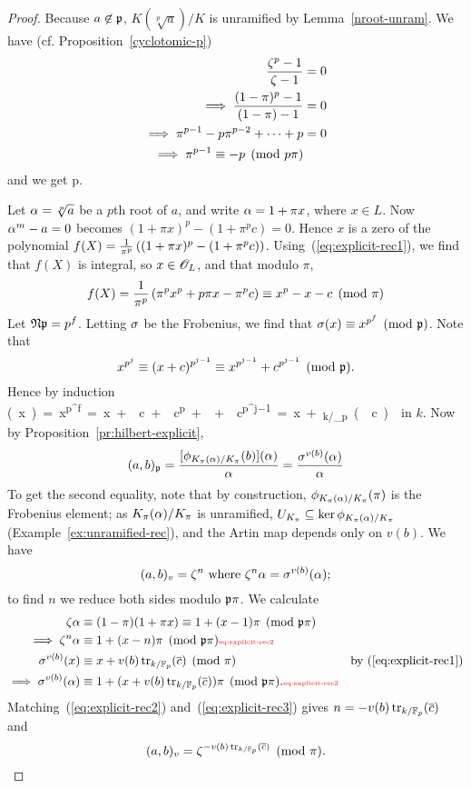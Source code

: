 \begin{proof}
Because $a\not\in \mathfrak{p}$, $K(\sqrt[p]{a})/K$ is unramified by Lemma~\ref{nroot-unram}. 
We have (cf. Proposition~\ref{cyclotomic-p}) 
\begin{align*}
\frac{\zeta^p-1}{\zeta-1}&=0\\
\implies \frac{(1-\pi)^p-1}{(1-\pi)-1}&=0\\
\implies \pi^{p-1}-p\pi^{p-2}+\cdots +p&=0\\
\implies \pi^{p-1}\equiv -p\pmod{p\pi}
\end{align*}
and we get 
p\pmod{\mfp}.
\eeq

Let $\alpha=\sqrt[p]{a}$ be a $p$th root of $a$, and write $\alpha=1+\pi x$, where $x\in L$. Now $\alpha^m-a=0$ becomes $(1+\pi x)^p-(1+\pi^pc)=0$. Hence $x$ is a zero of the polynomial $f(X)=\frac{1}{\pi^p}\left( {(1+\pi x)^p-(1+\pi^pc)} \right)$. 
Using~(\ref{eq:explicit-rec1}), we find that $f(X)$ is integral, so $x\in \mathscr{O}_L$, and that modulo $\pi$,
\[
f(X)=\frac{1}{\pi^p}\left( { \pi^px^p+p\pi x-\pi^pc} \right)\equiv x^p-x-c\pmod{\pi}\]
Let $\mathfrak{N}\mathfrak{p}=p^f$. Letting $\sigma$ be the Frobenius, we find that 
$\sigma(x)\equiv x^{p^f}\pmod{\mathfrak{p}}$. Note that
\[
x^{p^j}\equiv (x+c)^{p^{j-1}}\equiv x^{p^{j-1}}+c^{p^{j-1}}\pmod{\mathfrak{p}}.
\]
Hence by induction
\si(x)=x^{p^f}=x+\ol c+\ol c^p+\cdots +\ol c^{p^{j-1}}=x+\tr_{k/\F_p}(\ol c)
\eeq
in $k$. Now by Proposition~\ref{pr:hilbert-explicit},
\[
(a,b)_{\mathfrak{p}}=\frac{[\phi_{K_{\pi}(\alpha)/K_{\pi}}(b)](\alpha)}{\alpha}=\frac{\sigma^{v(b)}(\alpha)}{\alpha}
\]
To get the second equality, note that by construction, $\phi_{K_{\pi}(\alpha)/K_{\pi}}(\pi)$ is the Frobenius element; as $K_{\pi}(\alpha)/K_{\pi}$ is unramified, $U_{K_{\pi}}\subseteq \ker \phi_{K_{\pi}(\alpha)/K_{\pi}}$ (Example~\ref{ex:unramified-rec}), and the Artin map depends only on $v(b)$. We have
\[
(a,b)_v=\zeta^n\text{ where }\zeta^n\alpha=\sigma^{v(b)}(\alpha);
\]
to find $n$ we reduce both sides modulo $\mathfrak{p}\pi$. We calculate
\begin{align}
\ze\al&\equiv (1-\pi)(1+\pi x)\equiv 1+(x-1)\pi\pmod{\mfp\pi}\\
\implies \ze^n\al & \equiv 1+(x-n)\pi\pmod{\mfp\pi}
\llabel{eq:explicit-rec2}\\
\si^{v(b)}(x)&\equiv x+v(b)\tr_{k/\F_p}(\ol c)\pmod{\pi}&\text{by~(\ref{eq:explicit-rec1})}\\
\implies \si^{v(b)}(\al)&\equiv 1+(x+v(b)\tr_{k/\F_p}(\ol c))\pi\pmod{\mfp\pi}.\llabel{eq:explicit-rec3}
\end{align}
Matching~(\ref{eq:explicit-rec2}) and~(\ref{eq:explicit-rec3}) gives $n=-v(b)\operatorname{tr}_{k/\mathbb{F}_p}(\overline{c})$ and
\[
(a,b)_v=\zeta^{-v(b)\operatorname{tr}_{k/\mathbb{F}_p}(\overline{c})}\pmod{\pi}.
\]
\end{proof}
